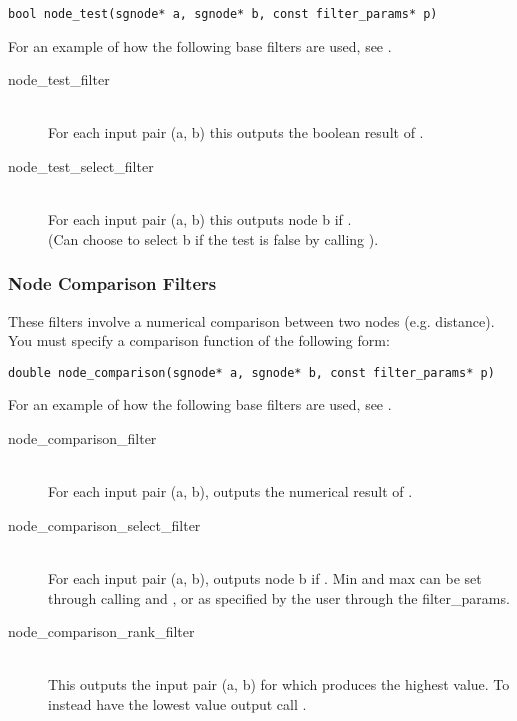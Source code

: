\begin{verbatim}
bool node_test(sgnode* a, sgnode* b, const filter_params* p)
\end{verbatim}

For an example of how the following base filters are used, see .

\begin{description}
	\item[node\_test\_filter] \hfill \\
		For each input pair (a, b) this outputs the boolean result of .
	\item[node\_test\_select\_filter] \hfill \\
		For each input pair (a, b) this outputs node b if . \\
		(Can choose to select b if the test is false by calling ).
\end{description}

\subsubsection{Node Comparison Filters}
These filters involve a numerical comparison between two nodes (e.g. distance).
You must specify a comparison function of the following form:
\begin{verbatim}
double node_comparison(sgnode* a, sgnode* b, const filter_params* p)
\end{verbatim}

For an example of how the following base filters are used, see .

\begin{description}
	\item[node\_comparison\_filter] \hfill \\
		For each input pair (a, b), outputs the numerical result of .
	\item[node\_comparison\_select\_filter] \hfill \\
		For each input pair (a, b), outputs node b if . Min and max can be set through calling  and , or as specified by the user through the filter\_params.
	\item[node\_comparison\_rank\_filter] \hfill \\
		This outputs the input pair (a, b) for which  produces the highest value. To instead have the lowest value output call .
\end{description}


